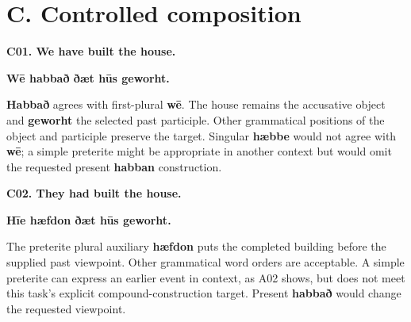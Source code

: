 \section*{C. Controlled composition}

\par\begin{minipage}{\linewidth}\raggedright
\textbf{C01. We have built the house.}

\textbf{Wē habbað ðæt hūs geworht.}

\textbf{Habbað} agrees with first-plural \textbf{wē}. The house remains the accusative object and \textbf{geworht} the selected past participle. Other grammatical positions of the object and participle preserve the target. Singular \textbf{hæbbe} would not agree with \textbf{wē}; a simple preterite might be appropriate in another context but would omit the requested present \textbf{habban} construction.

\end{minipage}\par\addvspace{4pt}

\par\begin{minipage}{\linewidth}\raggedright
\textbf{C02. They had built the house.}

\textbf{Hīe hæfdon ðæt hūs geworht.}

The preterite plural auxiliary \textbf{hæfdon} puts the completed building before the supplied past viewpoint. Other grammatical word orders are acceptable. A simple preterite can express an earlier event in context, as A02 shows, but does not meet this task's explicit compound-construction target. Present \textbf{habbað} would change the requested viewpoint.

\end{minipage}\par\addvspace{4pt}

